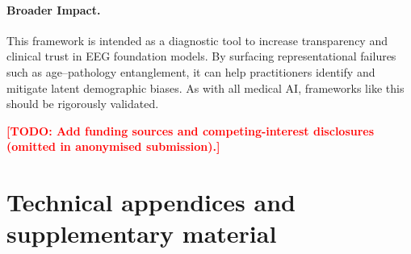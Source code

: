 \documentclass{article}
\newcommand{\todoNote}[1]{\textcolor{red}{\textbf{[TODO: #1]}}}
\begin{document}
\paragraph{Broader Impact.} This framework is intended as a diagnostic tool to increase transparency and clinical trust in EEG foundation models. By surfacing representational failures such as age–pathology entanglement, it can help practitioners identify and mitigate latent demographic biases. As with all medical AI, frameworks like this should be rigorously validated.


\begin{ack}
\todoNote{Add funding sources and competing-interest disclosures (omitted in anonymised submission).}
\end{ack}




\appendix

\section{Technical appendices and supplementary material}
\end{document}
